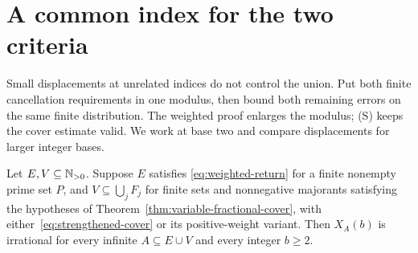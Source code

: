 \documentclass[11pt]{article}
\begin{document}
\section{A common index for the two criteria}\label{sec:mixed}
Small displacements at unrelated indices do not control the union.
Put both finite cancellation requirements in one modulus, then bound
both remaining errors on the same finite distribution. The weighted
proof enlarges the modulus; (S) keeps the cover estimate valid.
We work at base two and compare displacements for larger integer bases.
\begin{samepage}
\begin{theorem}\label{res:mixed-supports}
Let $E,V\subseteq\mathbb{N}_{>0}$.  Suppose $E$ satisfies
\eqref{eq:weighted-return} for a finite nonempty prime set $P$, and
$V\subseteq\bigcup_jF_j$ for finite sets and nonnegative majorants
satisfying the hypotheses of Theorem~\ref{thm:variable-fractional-cover},
with either~\eqref{eq:strengthened-cover} or its positive-weight variant.
Then $X_A(b)$ is irrational for every
infinite $A\subseteq E\cup V$ and every integer $b\ge2$.
\end{theorem}
\end{samepage}
\end{document}
